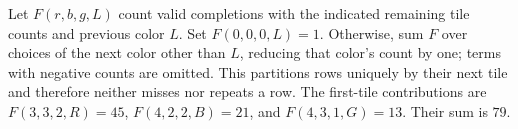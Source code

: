Let $F(r,b,g,L)$ count valid completions with the indicated remaining tile counts and previous color $L$. Set $F(0,0,0,L)=1$. Otherwise, sum $F$ over choices of the next color other than $L$, reducing that color's count by one; terms with negative counts are omitted. This partitions rows uniquely by their next tile and therefore neither misses nor repeats a row. The first-tile contributions are $F(3,3,2,R)=45$, $F(4,2,2,B)=21$, and $F(4,3,1,G)=13$. Their sum is $\boxed{79}$.
